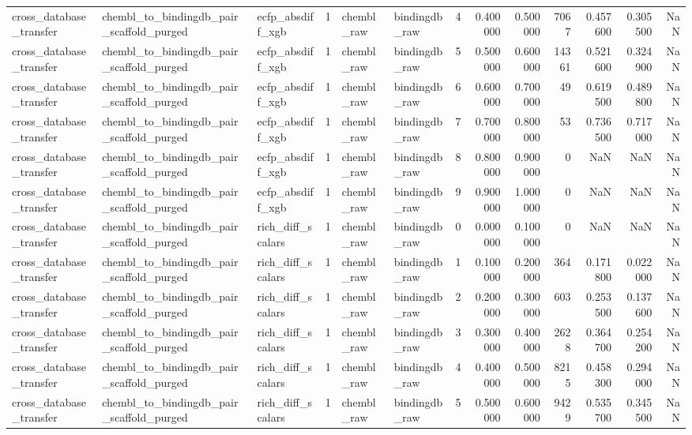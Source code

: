 \begin{longtable}{lllrllrrrrrrr}
cross\_database\_transfer & chembl\_to\_bindingdb\_pair\_scaffold\_purged & ecfp\_absdiff\_xgb & 1 & chembl\_raw & bindingdb\_raw & 4 & 0.400000 & 0.500000 & 7067 & 0.457600 & 0.305500 & NaN \\
cross\_database\_transfer & chembl\_to\_bindingdb\_pair\_scaffold\_purged & ecfp\_absdiff\_xgb & 1 & chembl\_raw & bindingdb\_raw & 5 & 0.500000 & 0.600000 & 14361 & 0.521600 & 0.324900 & NaN \\
cross\_database\_transfer & chembl\_to\_bindingdb\_pair\_scaffold\_purged & ecfp\_absdiff\_xgb & 1 & chembl\_raw & bindingdb\_raw & 6 & 0.600000 & 0.700000 & 49 & 0.619500 & 0.489800 & NaN \\
cross\_database\_transfer & chembl\_to\_bindingdb\_pair\_scaffold\_purged & ecfp\_absdiff\_xgb & 1 & chembl\_raw & bindingdb\_raw & 7 & 0.700000 & 0.800000 & 53 & 0.736500 & 0.717000 & NaN \\
cross\_database\_transfer & chembl\_to\_bindingdb\_pair\_scaffold\_purged & ecfp\_absdiff\_xgb & 1 & chembl\_raw & bindingdb\_raw & 8 & 0.800000 & 0.900000 & 0 & NaN & NaN & NaN \\
cross\_database\_transfer & chembl\_to\_bindingdb\_pair\_scaffold\_purged & ecfp\_absdiff\_xgb & 1 & chembl\_raw & bindingdb\_raw & 9 & 0.900000 & 1.000000 & 0 & NaN & NaN & NaN \\
cross\_database\_transfer & chembl\_to\_bindingdb\_pair\_scaffold\_purged & rich\_diff\_scalars & 1 & chembl\_raw & bindingdb\_raw & 0 & 0.000000 & 0.100000 & 0 & NaN & NaN & NaN \\
cross\_database\_transfer & chembl\_to\_bindingdb\_pair\_scaffold\_purged & rich\_diff\_scalars & 1 & chembl\_raw & bindingdb\_raw & 1 & 0.100000 & 0.200000 & 364 & 0.171800 & 0.022000 & NaN \\
cross\_database\_transfer & chembl\_to\_bindingdb\_pair\_scaffold\_purged & rich\_diff\_scalars & 1 & chembl\_raw & bindingdb\_raw & 2 & 0.200000 & 0.300000 & 603 & 0.253500 & 0.137600 & NaN \\
cross\_database\_transfer & chembl\_to\_bindingdb\_pair\_scaffold\_purged & rich\_diff\_scalars & 1 & chembl\_raw & bindingdb\_raw & 3 & 0.300000 & 0.400000 & 2628 & 0.364700 & 0.254200 & NaN \\
cross\_database\_transfer & chembl\_to\_bindingdb\_pair\_scaffold\_purged & rich\_diff\_scalars & 1 & chembl\_raw & bindingdb\_raw & 4 & 0.400000 & 0.500000 & 8215 & 0.458300 & 0.294000 & NaN \\
cross\_database\_transfer & chembl\_to\_bindingdb\_pair\_scaffold\_purged & rich\_diff\_scalars & 1 & chembl\_raw & bindingdb\_raw & 5 & 0.500000 & 0.600000 & 9429 & 0.535700 & 0.345500 & NaN \\

\end{longtable}
